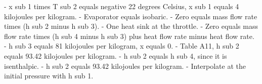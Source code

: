 - x sub 1 times T sub 2 equals negative 22 degrees Celsius, x sub 1 equals 4 kilojoules per kilogram.
- Evaporator equals isobaric.
- Zero equals mass flow rate times (h sub 2 minus h sub 3).
- One heat sink at the throttle.
- Zero equals mass flow rate times (h sub 4 minus h sub 3) plus heat flow rate minus heat flow rate.
- h sub 3 equals 81 kilojoules per kilogram, x equals 0.
- Table A11, h sub 2 equals 93.42 kilojoules per kilogram.
- h sub 2 equals h sub 4, since it is isenthalpic.
- h sub 2 equals 93.42 kilojoules per kilogram.
- Interpolate at the initial pressure with h sub 1.